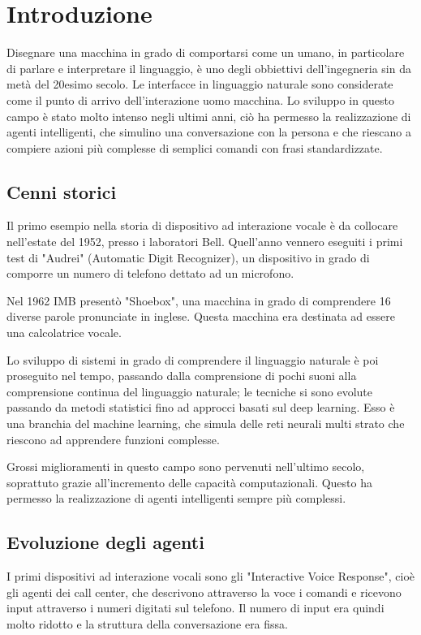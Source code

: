 \documentclass[twoside]{supsistudent}
\begin{document}
\chapter{Introduzione}

Disegnare una macchina in grado di comportarsi come un umano, in particolare di parlare e interpretare il linguaggio, è uno degli obbiettivi dell'ingegneria sin da metà del 20esimo secolo. Le interfacce in linguaggio naturale sono considerate come il punto di arrivo dell'interazione uomo macchina.
Lo sviluppo in questo campo è stato molto intenso negli ultimi anni, ciò ha permesso la realizzazione di agenti intelligenti, che simulino una conversazione con la persona e che riescano a compiere azioni più complesse di semplici comandi con frasi standardizzate.

\section{Cenni storici}

Il primo esempio nella storia di dispositivo ad interazione vocale è da collocare nell'estate del 1952, presso i laboratori Bell.
Quell'anno vennero eseguiti i primi test di "Audrei" (Automatic Digit Recognizer), un dispositivo in grado di comporre un numero di telefono dettato ad un microfono.

Nel 1962 IMB presentò "Shoebox", una macchina in grado di comprendere 16 diverse parole pronunciate in inglese. Questa macchina era destinata ad essere una calcolatrice vocale.

Lo sviluppo di sistemi in grado di comprendere il linguaggio naturale è poi proseguito nel tempo, passando dalla comprensione di pochi suoni alla comprensione continua del linguaggio naturale; le tecniche si sono evolute passando da metodi statistici fino ad approcci basati sul deep learning. Esso è una branchia del machine learning, che simula delle reti neurali multi strato che riescono ad apprendere funzioni complesse. \cite{deeplearninggeneral}

Grossi miglioramenti in questo campo sono pervenuti nell'ultimo secolo, soprattuto grazie all'incremento delle capacità computazionali. Questo ha permesso la realizzazione di agenti intelligenti sempre più complessi.

\section{Evoluzione degli agenti}

I primi dispositivi ad interazione vocali sono gli "Interactive Voice Response", cioè gli agenti dei call center, che descrivono attraverso la voce i comandi e ricevono input attraverso i numeri digitati sul telefono. Il numero di input era quindi molto ridotto e la struttura della conversazione era fissa.
\end{document}
